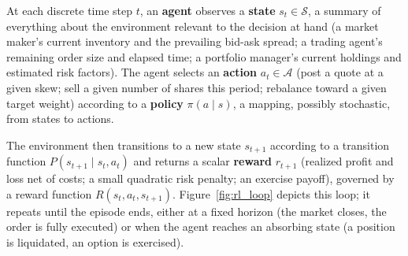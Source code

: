 \documentclass[../ai_in_finance]{subfiles}
\begin{document}
At each discrete time step $t$, an \textbf{agent} observes a \textbf{state} $s_t \in \mathcal{S}$, a summary of everything about the environment relevant to the decision at hand (a market maker's current inventory and the prevailing bid-ask spread; a trading agent's remaining order size and elapsed time; a portfolio manager's current holdings and estimated risk factors). The agent selects an \textbf{action} $a_t \in \mathcal{A}$ (post a quote at a given skew; sell a given number of shares this period; rebalance toward a given target weight) according to a \textbf{policy} $\pi(a \mid s)$, a mapping, possibly stochastic, from states to actions.

The environment then transitions to a new state $s_{t+1}$ according to a transition function $P(s_{t+1} \mid s_t, a_t)$ and returns a scalar \textbf{reward} $r_{t+1}$ (realized profit and loss net of costs; a small quadratic risk penalty; an exercise payoff), governed by a reward function $R(s_t, a_t, s_{t+1})$. Figure~\ref{fig:rl_loop} depicts this loop; it repeats until the episode ends, either at a fixed horizon (the market closes, the order is fully executed) or when the agent reaches an absorbing state (a position is liquidated, an option is exercised).

\begin{figure}[htbp]
\centering
\begin{lrbox}{\bookmeasuredbox}
\end{lrbox}
\ifdim\wd\bookmeasuredbox<0.65\linewidth
\setlength{\bookcapwidth}{0.65\linewidth}
\else
\setlength{\bookcapwidth}{\wd\bookmeasuredbox}
\fi
{}
\end{figure}
\end{document}
